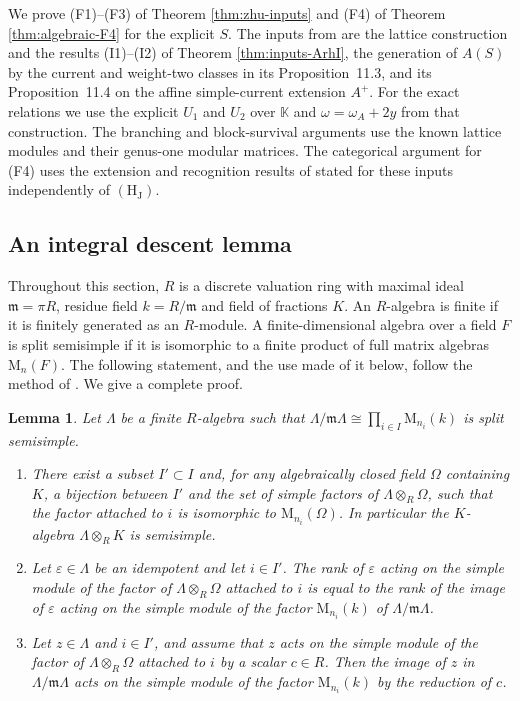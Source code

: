 \documentclass[leqno]{article}
\newcommand{\K}{\ensuremath{\mathbb{K}}}
\newcommand{\M}{\mathrm{M}}
\newcommand{\ot}{\otimes}
\newcommand{\epsi}{\varepsilon}
\newtheorem{lemma}[thm]{Lemma}
\numberwithin{equation}{section}
\begin{document}
We prove (F1)--(F3) of Theorem \ref{thm:zhu-inputs} and (F4) of Theorem \ref{thm:algebraic-F4} for the explicit $S$. The inputs from \cite{Arh26} are the lattice construction and the results (I1)--(I2) of Theorem \ref{thm:inputs-ArhI}, the generation of $A(S)$ by the current and weight-two classes in its Proposition~11.3, and its Proposition~11.4 on the affine simple-current extension $A^+$. For the exact relations we use the explicit $U_1$ and $U_2$ over $\K$ and $\omega=\omega_A+2y$ from that construction. The branching and block-survival arguments use the known lattice modules and their genus-one modular matrices. The categorical argument for (F4) uses the extension and recognition results of \cite{ArhII} stated for these inputs independently of $\mathrm{(H_J)}$.

\subsection{An integral descent lemma}
\label{zhu:sec:descent}

Throughout this section, $R$ is a discrete valuation ring with maximal ideal $\mathfrak m = \pi R$, residue field $k = R/\mathfrak m$ and field of fractions $K$. An $R$-algebra is finite if it is finitely generated as an $R$-module. A finite-dimensional algebra over a field $F$ is split semisimple if it is isomorphic to a finite product of full matrix algebras $\M_n(F)$. The following statement, and the use made of it below, follow the method of \cite[Lemma 9.6 p.~55]{Rie26b}. We give a complete proof.

\begin{lemma}
\label{zhu:lem:descent}
Let $\Lambda$ be a finite $R$-algebra such that $\Lambda/\mathfrak m\Lambda \cong \prod_{i \in I} \M_{n_i}(k)$ is split semisimple.
\begin{enumerate}
\item There exist a subset $I' \subset I$ and, for any algebraically closed field $\Omega$ containing $K$, a bijection between $I'$ and the set of simple factors of $\Lambda \ot_R \Omega$, such that the factor attached to $i$ is isomorphic to $\M_{n_i}(\Omega)$. In particular the $K$-algebra $\Lambda \ot_R K$ is semisimple.
\item Let $\epsi \in \Lambda$ be an idempotent and let $i \in I'$. The rank of $\epsi$ acting on the simple module of the factor of $\Lambda \ot_R \Omega$ attached to $i$ is equal to the rank of the image of $\epsi$ acting on the simple module of the factor $\M_{n_i}(k)$ of $\Lambda/\mathfrak m\Lambda$.
\item Let $z \in \Lambda$ and $i \in I'$, and assume that $z$ acts on the simple module of the factor of $\Lambda \ot_R \Omega$ attached to $i$ by a scalar $c \in R$. Then the image of $z$ in $\Lambda/\mathfrak m\Lambda$ acts on the simple module of the factor $\M_{n_i}(k)$ by the reduction of $c$.
\end{enumerate}
\end{lemma}
\end{document}
